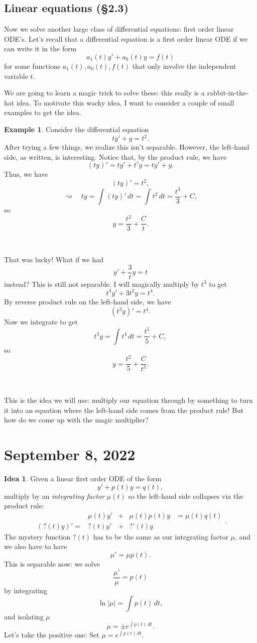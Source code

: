 \documentclass[12pt]{amsart}
\numberwithin{equation}{section}
\theoremstyle{plain} %
\newcommand{\Sept}[1]{\section{September #1, 2022}}
\newcommand{\rsa}{\rightsquigarrow}
\theoremstyle{definition}
\newtheorem{ex}[equation]{Example}
\newtheorem{idea}[equation]{Idea}
\theoremstyle{remark}
\begin{document}
\subsection*{Linear equations (\S2.3)} Now we solve another large class of differential equations: first order linear ODE's. Let's recall that a differential equation is a first order linear ODE if we can write it in the form
\[ a_1(t) y' + a_0(t) y = f(t)\]
for some functions $a_1(t),a_0(t),f(t)$ that only involve the independent variable $t$.

We are going to learn a magic trick to solve these: this really is a rabbit-in-the-hat idea. To motivate this wacky idea, I want to consider a couple of small examples to get the idea.

\begin{ex}
Consider the differential equation
\[ t y' + y=t^2.\]
After trying a few things, we realize this isn't separable. However, the left-hand side, as written, is interesting. Notice that, by the product rule, we have
\[ (ty)' = t y' + t' y= t y' + y.\]
Thus, we have
\[ (ty)' = t^2,\]
\[\rsa \quad ty = \int (ty)' \, dt = \int t^2 \, dt = \frac{t^3}{3} + C,\]
so \[ y = \frac{t^2}{3} + \frac{C}{t}.\]

\

That was lucky! What if we had
\[ y' + \frac{3}{t} y = t\]
instead? This is still not separable. I will magically multiply by $t^3$ to get
\[ t^3 y' + 3t^2 y = t^4.\]
By reverse product rule on the left-hand side, we have
\[ (t^3 y)' = t^4.\]
Now we integrate to get
\[ t^3 y = \int t^4 \, dt = \frac{t^5}{5} +C,\]
so \[y = \frac{t^2}{5} + \frac{C}{t^3}.\]

\

This is the idea we will use: multiply our equation through by something to turn it into an equation where the left-hand side comes from the product rule! But how do we come up with the magic multiplier?
\end{ex}

\Sept{8}
\begin{idea}
Given a linear first order ODE of the form
\[ y' + p(t) y = q(t),\]
multiply by an \emph{integrating factor} $\mu(t)$ so the left-hand side collapses via the product rule:
\[ \begin{array}{rcccl}
 &\mu(t) y' &+& \mu(t) p(t) y &= \mu(t) q(t)\\
 ( ?(t) y)' = &?(t) y' &+& ?'(t) y & \end{array}.\]
The mystery function $?(t)$ has to be the same as our integrating factor $\mu$, and we also have to have
\[ \mu' = \mu p(t).\]
This is separable now: we solve
\[ \frac{\mu'}{\mu} = p(t)\]
by integrating
\[ \ln |\mu| = \int p(t) \, dt,\]
and isolating $\mu$
\[ \mu = \pm e^{\int p(t) \, dt}.\]
Let's take the positive one:
Set $\mu = e^{\int p(t) \, dt}$.
\end{idea}
\end{document}
